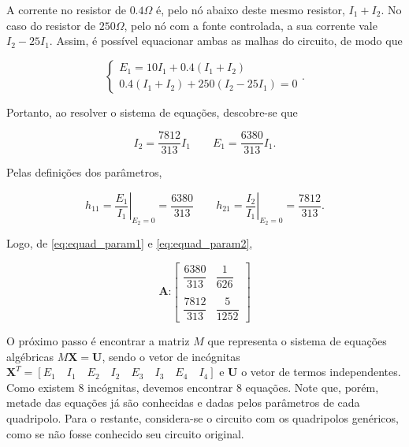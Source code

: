 \documentclass{article}
\numberwithin{equation}{section}
\let\l\left
\let\r\right
\let\dfr\dfrac
\begin{document}
\noindent A corrente no resistor de $0.4\Omega$ é, pelo nó abaixo deste mesmo resistor, $I_1+I_2$. No caso do resistor de $250\Omega$, pelo nó com a fonte controlada, a sua corrente vale $I_2- 25I_1$. Assim, é possível equacionar ambas as malhas do circuito, de modo que

\begin{equation*}
    \begin{cases}
        E_1 = 10I_1 + 0.4(I_1+I_2)
        \\
        0.4(I_1+I_2) + 250(I_2-25I_1) = 0
    \end{cases}
    .
\end{equation*}

\noindent Portanto, ao resolver o sistema de equações, descobre-se que

\begin{equation*}
    I_2 = \dfr{7812}{313}I_1 \qquad E_1 = \dfr{6380}{313}I_1.
\end{equation*}

\noindent Pelas definições dos parâmetros,

\begin{equation}
    h_{11}=\l.\dfr{E_{1}}{I_{1}}\r|_{E_{2}=0} = \dfr{6380}{313}
    \qquad
    h_{21}=\l.\dfr{I_{2}}{I_{1}}\r|_{E_{2}=0} = \dfr{7812}{313}.
    \label{eq:equad_param2}
\end{equation}

\noindent Logo, de \eqref{eq:equad_param1} e \eqref{eq:equad_param2},

\begin{equation}
    \textbf{A:}
    \begin{bmatrix}
        \dfr{6380}{313} & \dfr{1}{626} \\
        & \\
        \dfr{7812}{313} & \dfr{5}{1252}
    \end{bmatrix}
\end{equation}

\noindent O próximo passo é encontrar a matriz $M$ que representa o sistema de equações algébricas $M\mathbf{X}=\mathbf{U}$, sendo o vetor de incógnitas $\mathbf{X}^T=[E_1 \quad I_1 \quad E_2 \quad I_2 \quad E_3 \quad I_3 \quad E_4 \quad I_4]$ e $\mathbf{U}$ o vetor de termos independentes. Como existem 8 incógnitas, devemos encontrar 8 equações. Note que, porém, metade das equações já são conhecidas e dadas pelos parâmetros de cada quadripolo. Para o restante, considera-se o circuito com os quadripolos genéricos, como se não fosse conhecido seu circuito original.
\end{document}
